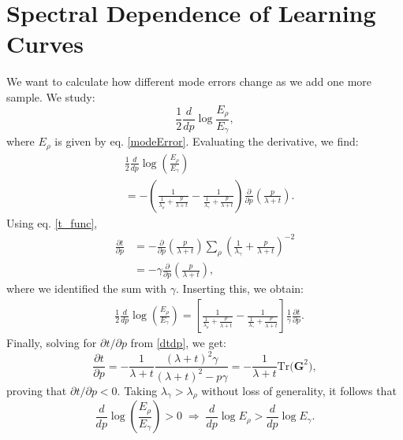 \documentclass{article}
\begin{document}
\section{Spectral Dependence of Learning Curves}\label{SISpectralDependency}

We want to calculate how different mode errors change as we add one more sample. We study:
\begin{equation}
    \frac{1}{2}\frac{d}{dp}\log{\frac{E_\rho}{E_\gamma}},
\end{equation}
where $E_\rho$ is given by eq. \eqref{modeError}. Evaluating the derivative, we find:
\begin{align}
    &\frac{1}{2} \frac{d}{dp}\log\left( \frac{E_\rho}{E_\gamma} \right)\nonumber\\
    &= -\left( \frac{1}{\frac{1}{\lambda_\rho} + \frac{p}{\lambda+t}} -\frac{1}{\frac{1}{\lambda_\gamma} + \frac{p}{\lambda+t}}  \right) \frac{\partial }{\partial p}\left(\frac{p}{\lambda+t}\right).
\end{align}
Using eq. \eqref{t_func},
\begin{align}\label{dtdp}
    \frac{\partial t}{\partial p} &= -\frac{\partial }{\partial p}\left(\frac{p}{\lambda+t}\right)\sum_\rho\left(\frac{1}{\lambda_\gamma} + \frac{p}{\lambda+t}\right)^{-2} \nonumber\\
    & = -\gamma \frac{\partial }{\partial p}\left(\frac{p}{\lambda+t}\right),
\end{align}
where we identified the sum with $\gamma$. Inserting this, we obtain:
\begin{align}
    &\frac{1}{2} \frac{d}{dp}\log\left( \frac{E_\rho}{E_\gamma} \right) = \left[ \frac{1}{\frac{1}{\lambda_\rho} + \frac{p}{\lambda+t}} -\frac{1}{\frac{1}{\lambda_\gamma} + \frac{p}{\lambda+t}}  \right]\frac{1}{\gamma}\frac{\partial t}{\partial p}.
\end{align}
Finally, solving for $\partial t/\partial p$ from \eqref{dtdp}, we get:
\begin{equation}
    \frac{\partial t}{\partial p} = -\frac{1}{\lambda+t}\frac{(\lambda+t)^2\gamma}{(\lambda+t)^2-p\gamma} = -\frac{1}{\lambda+t}\text{Tr}\big({\mathbf{G}^2}\big),
\end{equation}
proving that $\partial t/\partial p < 0$. Taking $\lambda_\gamma>\lambda_\rho$ without loss of generality, it follows that
\begin{equation}
    \frac{d}{dp}\log\left( \frac{E_\rho}{E_\gamma} \right) > 0\;\Rightarrow\; \frac{d}{dp} \log E_\rho > \frac{d}{dp} \log E_\gamma.
\end{equation}
\end{document}
